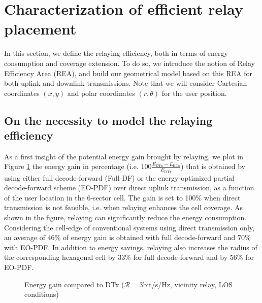\documentclass[journal]{IEEEtran}
\theoremstyle{definition}
\begin{document}
\section{Characterization of efficient relay placement}
\label{sec:model}

In this section, we define the relaying efficiency, both in terms of energy consumption and coverage extension. To do so, we introduce the notion of Relay Efficiency Area (REA), and build our geometrical model based on this REA for both uplink and downlink transmissions. Note that we will consider Cartesian coordinates $(x,y)$ and polar coordinates $(r,\theta)$ for the user position.

\subsection{On the necessity to model the relaying efficiency}

As a first insight of the potential energy gain brought by relaying, we plot in Figure \ref{fig:Energy_gain} the energy gain in percentage (i.e. $100\frac{E_{\text{DTx}}-E_{\text{RTx}}}{E_{\text{DTx}}}$) that is obtained by using either full decode-forward (Full-DF) or the energy-optimized partial decode-forward scheme (EO-PDF) over direct uplink transmission, as a function of the user location in the 6-sector cell. The gain is set to 100\% when direct transmission is not feasible, i.e. when relaying enhances the cell coverage.
As shown in the figure, relaying can significantly reduce the energy consumption.
Considering the cell-edge of conventional systems using direct transmission only,
an average of 46\% of energy gain is obtained with full decode-forward and 70\% with EO-PDF. In addition to energy savings, relaying also increases the radius of the corresponding hexagonal cell by 33\% for full decode-forward and by 56\% for EO-PDF.

\begin{figure}
	{\centering
	 \caption{Energy gain compared to DTx ($\mathcal{R}=3$bit/s/Hz, vicinity relay, LOS conditions)}  
	\label{fig:Energy_gain} 
	}
\end{figure}
\end{document}
